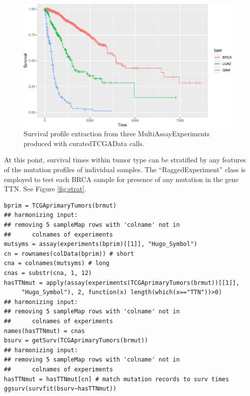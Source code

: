 \documentclass[graybox]{svmult}
\begin{document}
\begin{figure}
\includegraphics[width=0.8\linewidth,]{bioccb_files/figure-latex/dothesurv-1} \caption{Survival profile extraction from three MultiAssayExperiments produced with curatedTCGAData calls.}\label{fig:dothesurv}
\end{figure}

At this point, survival times within tumor type can be stratified by any
features of the mutation profiles of individual samples.
The ``RaggedExperiment'' class is employed to test each BRCA sample for
presence of any mutation in the gene TTN. See Figure \ref{fig:strat}.

\begin{shaded}
\begin{verbatim}
bprim = TCGAprimaryTumors(brmut)
## harmonizing input:
## removing 5 sampleMap rows with 'colname' not in 
##      colnames of experiments
mutsyms = assay(experiments(bprim)[[1]], "Hugo_Symbol")
cn = rownames(colData(bprim)) # short
cna = colnames(mutsyms) # long
cnas = substr(cna, 1, 12)
hasTTNmut = apply(assay(experiments(TCGAprimaryTumors(brmut))[[1]], 
     "Hugo_Symbol"), 2, function(x) length(which(x=="TTN"))>0)
## harmonizing input:
## removing 5 sampleMap rows with 'colname' not in
##      colnames of experiments
names(hasTTNmut) = cnas
bsurv = getSurv(TCGAprimaryTumors(brmut))
## harmonizing input:
## removing 5 sampleMap rows with 'colname' not in 
##      colnames of experiments
hasTTNmut = hasTTNmut[cn] # match mutation records to surv times
ggsurv(survfit(bsurv~hasTTNmut))
\end{verbatim}
\end{shaded}
\end{document}
